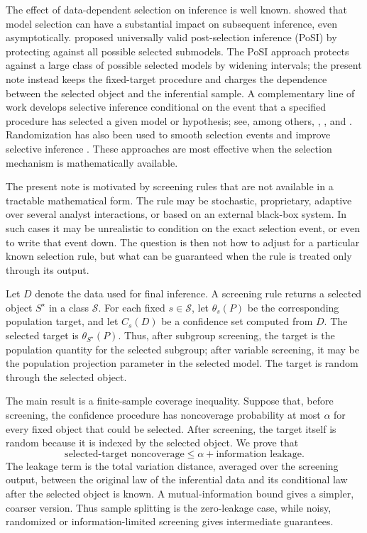 \documentclass[11pt]{article}
\newcommand{\calS}{\mathcal S}
\begin{document}
The effect of data-dependent selection on inference is well known. \citet{leeb2005model} showed that model selection can have a substantial impact on subsequent inference, even asymptotically. \citet{berk2013valid} proposed universally valid post-selection inference (PoSI) by protecting against all possible selected submodels. The PoSI approach protects against a large class of possible selected models by widening intervals; the present note instead keeps the fixed-target procedure and charges the dependence between the selected object and the inferential sample. A complementary line of work develops selective inference conditional on the event that a specified procedure has selected a given model or hypothesis; see, among others, \citet{fithian2014optimal}, \citet{lee2016exact}, \citet{taylor2015statistical} and \citet{tibshirani2016exact}. Randomization has also been used to smooth selection events and improve selective inference \citep{tian2018selective}. These approaches are most effective when the selection mechanism is mathematically available.

The present note is motivated by screening rules that are not available in a tractable mathematical form. The rule may be stochastic, proprietary, adaptive over several analyst interactions, or based on an external black-box system. In such cases it may be unrealistic to condition on the exact selection event, or even to write that event down. The question is then not how to adjust for a particular known selection rule, but what can be guaranteed when the rule is treated only through its output.

Let \(D\) denote the data used for final inference. A screening rule returns a selected object \(S^\star\) in a class \(\calS\). For each fixed \(s\in\calS\), let \(\theta_s(P)\) be the corresponding population target, and let \(C_s(D)\) be a confidence set computed from \(D\). The selected target is \(\theta_{S^\star}(P)\). Thus, after subgroup screening, the target is the population quantity for the selected subgroup; after variable screening, it may be the population projection parameter in the selected model. The target is random through the selected object.

The main result is a finite-sample coverage inequality. Suppose that, before screening, the confidence procedure has noncoverage probability at most \(\alpha\) for every fixed object that could be selected. After screening, the target itself is random because it is indexed by the selected object. We prove that
\[
\text{selected-target noncoverage}
\leq
\alpha+\text{information leakage}.
\]
The leakage term is the total variation distance, averaged over the screening output, between the original law of the inferential data and its conditional law after the selected object is known. A mutual-information bound gives a simpler, coarser version. Thus sample splitting is the zero-leakage case, while noisy, randomized or information-limited screening gives intermediate guarantees.
\end{document}
